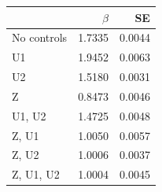 \begin{tabular}{lrr}
\hline
 & $\beta$ & SE \\
\hline
No controls & 1.7335 & 0.0044 \\
U1 & 1.9452 & 0.0063 \\
U2 & 1.5180 & 0.0031 \\
Z & 0.8473 & 0.0046 \\
U1, U2 & 1.4725 & 0.0048 \\
Z, U1 & 1.0050 & 0.0057 \\
Z, U2 & 1.0006 & 0.0037 \\
Z, U1, U2 & 1.0004 & 0.0045 \\
\hline
\end{tabular}
